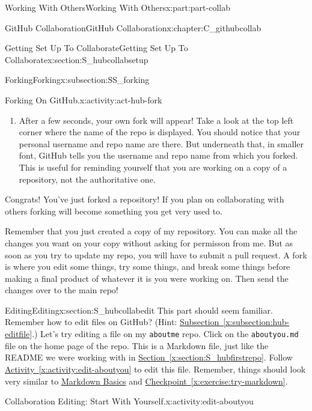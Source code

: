\documentclass[oneside,10pt,]{book}
\newcommand{\xreffont}{\relax}
\newcommand{\mono}[1]{\texttt{#1}}
\begin{document}
\begin{partptx}{Working With Others}{}{Working With Others}{}{}{x:part:part-collab}
\begin{chapterptx}{GitHub Collaboration}{}{GitHub Collaboration}{}{}{x:chapter:C_githubcollab}
\begin{sectionptx}{Getting Set Up To Collaborate}{}{Getting Set Up To Collaborate}{}{}{x:section:S_hubcollabsetup}
\begin{subsectionptx}{Forking}{}{Forking}{}{}{x:subsection:SS_forking}
\begin{activity}{Forking On GitHub.}{x:activity:act-hub-fork}
\begin{enumerate}[font=\bfseries,label=(\alph*),ref=\alph*]
\par
Click on the Create Fork button.%
\item{}After a few seconds, your own fork will appear! Take a look at the top left corner where the name of the repo is displayed. You should notice that your personal username and repo name are there. But underneath that, in smaller font, GitHub tells you the username and repo name from which you forked. This is useful for reminding yourself that you are working on a copy of a repository, not the authoritative one.%
\end{enumerate}
\end{activity}%
%
Congrats! You've just forked a repository! If you plan on collaborating with others forking will become something you get very used to.%
\par
Remember that you just created a copy of my repository. You can make all the changes you want on your copy without asking for permisson from me. But as soon as you try to update my repo, you will have to submit a pull request. A fork is where you edit some things, try some things, and break some things before making a final product of whatever it is you were working on. Then send the changes over to the main repo!%
\end{subsectionptx}
\end{sectionptx}
%
%
\typeout{************************************************}
\typeout{************************************************}
%
\begin{sectionptx}{Editing}{}{Editing}{}{}{x:section:S_hubcollabedit}
%
%
This part should seem familiar. Remember how to edit files on GitHub? (Hint: \hyperref[x:subsection:hub-editfile]{Subsection~{\xreffont\ref{x:subsection:hub-editfile}}}.) Let's try editing a file on my \mono{aboutme} repo. Click on the \mono{aboutyou.md} file on the home page of the repo. This is a Markdown file, just like the README we were working with in \hyperref[x:section:S_hubfirstrepo]{Section~{\xreffont\ref{x:section:S_hubfirstrepo}}}. Follow \hyperref[x:activity:edit-aboutyou]{Activity~{\xreffont\ref{x:activity:edit-aboutyou}}} to edit this file. Remember, things should look very similar to \hyperref[x:assemblage:markdown]{Markdown Basics} and \hyperref[x:exercise:try-markdown]{Checkpoint~{\xreffont\ref{x:exercise:try-markdown}}}.%
\begin{activity}{Collaboration Editing: Start With Yourself.}{x:activity:edit-aboutyou}%

\end{activity}
\end{sectionptx}
\end{chapterptx}
\end{partptx}
\end{document}
